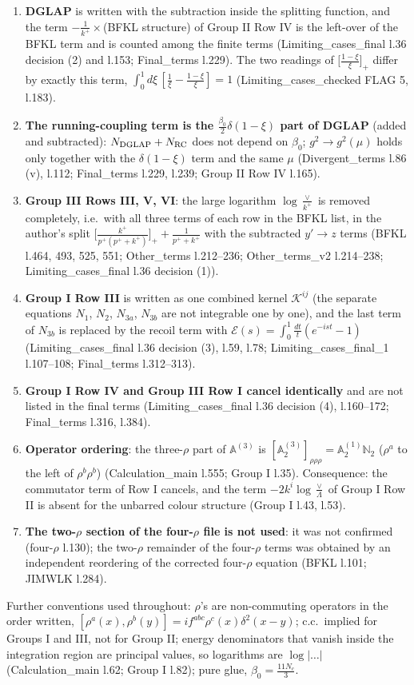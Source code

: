 \documentclass[10pt]{article}
\def\mf#1{\mathbb{#1}}
\begin{document}
\begin{enumerate}
\item \textbf{DGLAP} is written with the subtraction inside the splitting function, and the term $-\frac{1}{k^{+}}\times$(BFKL structure) of Group II Row IV is the left-over of the BFKL term and is counted among the finite terms (Limiting\_cases\_final l.36 decision (2) and l.153; Final\_terms l.229). The two readings of $\big[\frac{1-\xi}{\xi}\big]_{+}$ differ by exactly this term, $\int_{0}^{1}d\xi\,[\frac1\xi-\frac{1-\xi}{\xi}]=1$ (Limiting\_cases\_checked FLAG 5, l.183).
\item \textbf{The running-coupling term is the $\frac{\beta_{0}}{2}\delta(1-\xi)$ part of DGLAP} (added and subtracted): $N_{\rm DGLAP}+N_{\rm RC}$ does not depend on $\beta_{0}$; $g^{2}\to g^{2}(\mu)$ holds only together with the $\delta(1-\xi)$ term and the same $\mu$ (Divergent\_terms l.86 (v), l.112; Final\_terms l.229, l.239; Group II Row IV l.165).
\item \textbf{Group III Rows III, V, VI}: the large logarithm $\log\frac{\vee}{k^{+}}$ is removed completely, i.e.\ with all three terms of each row in the BFKL list, in the author's split $\big[\frac{k^{+}}{p^{+}(p^{+}+k^{+})}\big]_{+}+\frac{1}{p^{+}+k^{+}}$ with the subtracted $y'\to z$ terms (BFKL l.464, 493, 525, 551; Other\_terms l.212--236; Other\_terms\_v2 l.214--238; Limiting\_cases\_final l.36 decision (1)).
\item \textbf{Group I Row III} is written as one combined kernel $\mathcal{K}^{ij}$ (the separate equations $N_{1}$, $N_{2}$, $N_{3a}$, $N_{3b}$ are not integrable one by one), and the last term of $N_{3b}$ is replaced by the recoil term with $\mathcal{E}(s)=\int_{0}^{1}\frac{dt}{t}(e^{-ist}-1)$ (Limiting\_cases\_final l.36 decision (3), l.59, l.78; Limiting\_cases\_final\_1 l.107--108; Final\_terms l.312--313).
\item \textbf{Group I Row IV and Group III Row I cancel identically} and are not listed in the final terms (Limiting\_cases\_final l.36 decision (4), l.160--172; Final\_terms l.316, l.384).
\item \textbf{Operator ordering}: the three-$\rho$ part of $\mf{A}^{(3)}$ is $[\mf{A}^{(3)}_{2}]_{\rho\rho\rho}=\mf{A}^{(1)}_{2}\mf{N}_{2}$ ($\rho^{a}$ to the left of $\rho^{b}\rho^{b}$) (Calculation\_main l.555; Group I l.35). Consequence: the commutator term of Row I cancels, and the term $-2k^{i}\log\frac{\vee}{\Lambda}$ of Group I Row II is absent for the unbarred colour structure (Group I l.43, l.53).
\item \textbf{The two-$\rho$ section of the four-$\rho$ file is not used}: it was not confirmed (four-$\rho$ l.130); the two-$\rho$ remainder of the four-$\rho$ terms was obtained by an independent reordering of the corrected four-$\rho$ equation (BFKL l.101; JIMWLK l.284).
\end{enumerate}
\noindent Further conventions used throughout: $\rho$'s are non-commuting operators in the order written, $[\rho^{a}(x),\rho^{b}(y)]=if^{abc}\rho^{c}(x)\delta^{2}(x-y)$; c.c.\ implied for Groups I and III, not for Group II; energy denominators that vanish inside the integration region are principal values, so logarithms are $\log|\dots|$ (Calculation\_main l.62; Group I l.82); pure glue, $\beta_{0}=\frac{11N_{c}}{3}$.
\end{document}

